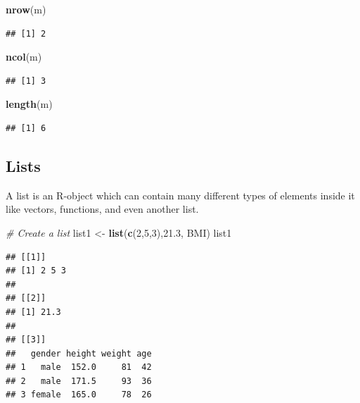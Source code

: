 \documentclass[
]{book}
\newenvironment{Shaded}{\begin{snugshade}}{\end{snugshade}}
\newcommand{\CommentTok}[1]{\textcolor[rgb]{0.56,0.35,0.01}{\textit{#1}}}
\newcommand{\DecValTok}[1]{\textcolor[rgb]{0.00,0.00,0.81}{#1}}
\newcommand{\FloatTok}[1]{\textcolor[rgb]{0.00,0.00,0.81}{#1}}
\newcommand{\FunctionTok}[1]{\textcolor[rgb]{0.13,0.29,0.53}{\textbf{#1}}}
\newcommand{\NormalTok}[1]{#1}
\newcommand{\OtherTok}[1]{\textcolor[rgb]{0.56,0.35,0.01}{#1}}
\begin{document}
\begin{Shaded}
\begin{Highlighting}[]
\FunctionTok{nrow}\NormalTok{(m)}
\end{Highlighting}
\end{Shaded}

\begin{verbatim}
## [1] 2
\end{verbatim}

\begin{Shaded}
\begin{Highlighting}[]
\FunctionTok{ncol}\NormalTok{(m)}
\end{Highlighting}
\end{Shaded}

\begin{verbatim}
## [1] 3
\end{verbatim}

\begin{Shaded}
\begin{Highlighting}[]
\FunctionTok{length}\NormalTok{(m)}
\end{Highlighting}
\end{Shaded}

\begin{verbatim}
## [1] 6
\end{verbatim}

\subsection*{Lists}\label{lists}

A list is an R-object which can contain many different types of elements inside it like vectors, functions, and even another list.

\begin{Shaded}
\begin{Highlighting}[]
\CommentTok{\# Create a list}
\NormalTok{list1 }\OtherTok{\textless{}{-}} \FunctionTok{list}\NormalTok{(}\FunctionTok{c}\NormalTok{(}\DecValTok{2}\NormalTok{,}\DecValTok{5}\NormalTok{,}\DecValTok{3}\NormalTok{),}\FloatTok{21.3}\NormalTok{, BMI)}
\NormalTok{list1}
\end{Highlighting}
\end{Shaded}

\begin{verbatim}
## [[1]]
## [1] 2 5 3
## 
## [[2]]
## [1] 21.3
## 
## [[3]]
##   gender height weight age
## 1   male  152.0     81  42
## 2   male  171.5     93  36
## 3 female  165.0     78  26
\end{verbatim}
\end{document}
